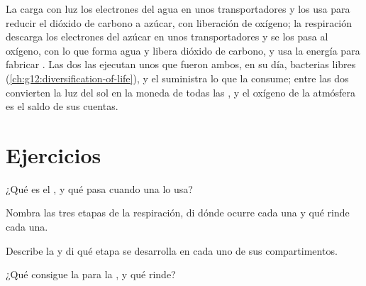 \begin{remark}\label{rem:g12:respiration-fermentation:mirror}
La  carga con luz los electrones del agua en unos
transportadores y los usa para reducir el dióxido de carbono a azúcar,
con liberación de oxígeno; la respiración descarga los electrones del
azúcar en unos transportadores y se los pasa al oxígeno, con lo que
forma agua y libera dióxido de carbono, y usa la energía para fabricar
. Las dos las ejecutan unos  que fueron ambos, en su día,
bacterias libres (\cref{ch:g12:diversification-of-life}), y el
 suministra lo que la  consume; entre las dos
convierten la luz del sol en la moneda de todas las , y el
oxígeno de la atmósfera es el saldo de sus cuentas.
\end{remark}

\section{Ejercicios}

\begin{exercise}[$\star$]\label{exo:g12:respiration-fermentation:1}
¿Qué es el , y qué pasa cuando una  lo usa?
\end{exercise}

\begin{exercise}[$\star$]\label{exo:g12:respiration-fermentation:2}
Nombra las tres etapas de la respiración, di dónde ocurre cada una y
qué rinde cada una.
\end{exercise}

\begin{exercise}[$\star$]\label{exo:g12:respiration-fermentation:3}
Describe la  y di qué etapa se desarrolla en cada uno de sus
compartimentos.
\end{exercise}

\begin{exercise}[$\star$]\label{exo:g12:respiration-fermentation:4}
¿Qué consigue la  para la , y qué rinde?
\end{exercise}

